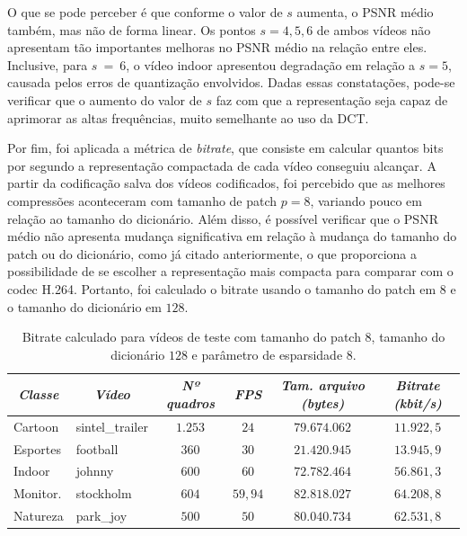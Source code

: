 \documentclass[cic,tc]{iiufrgs}
\begin{document}
O que se pode perceber é que conforme o valor de $s$ aumenta, o PSNR médio também, 
mas não de forma linear.
Os pontos $s=4,5,6$ de ambos vídeos não apresentam tão importantes melhoras no 
PSNR médio na relação entre eles. 
Inclusive, para $s~=~6$, o vídeo indoor apresentou degradação em relação a $s=5$, 
causada pelos erros de quantização envolvidos.
Dadas essas constatações, pode-se verificar que o aumento do valor de $s$ faz com 
que a representação seja capaz de aprimorar as altas frequências, muito semelhante 
ao uso da DCT.

Por fim, foi aplicada a métrica de \emph{bitrate},
que consiste em calcular quantos bits por segundo a representação compactada 
de cada vídeo conseguiu alcançar.
A partir da codificação salva dos vídeos codificados,
foi percebido que as melhores compressões aconteceram com tamanho de patch $p=8$, 
variando pouco em relação ao tamanho do dicionário.
Além disso, é possível verificar que o PSNR médio não apresenta mudança significativa em relação 
à mudança do tamanho do patch ou do dicionário, como já citado anteriormente,
o que proporciona a possibilidade de se escolher a representação mais compacta para 
comparar com o codec H.264.
Portanto, foi calculado o bitrate usando o tamanho do patch em $8$ e o tamanho do dicionário
em $128$.

\begin{table}[h]
    \caption{Bitrate calculado para vídeos de teste com tamanho do patch $8$, tamanho do 
    dicionário $128$ e parâmetro de esparsidade $8$.}
    \centering
        \begin{tabular}{|l|l|c|c|c|c|}
          \hline
          \multicolumn{1}{|c}{\textit{Classe}} & 
          \multicolumn{1}{|c}{\textit{Vídeo}} & 
          \multicolumn{1}{|c}{\textit{Nº quadros}} & 
          \multicolumn{1}{|c}{\textit{FPS}} & 
          \multicolumn{1}{|c}{\textit{Tam. arquivo (bytes)}} & 
          \multicolumn{1}{|c|}{\textit{Bitrate (kbit/s)}} \\
          \hline
          \hline
          Cartoon & sintel\_trailer & $1.253$ & $24$ & $79.674.062$ & $11.922,5$ \\
          Esportes & football &  $360$ & $30$ & $21.420.945$ & $13.945,9$ \\
          Indoor & johnny  &   $600$ & $60$ & $72.782.464$ & $56.861,3$ \\
          Monitor. & stockholm & $604$ & $59,94$ & $82.818.027$ & $64.208,8$ \\
          Natureza & park\_joy & $500$ & $50$ & $80.040.734$ & $62.531,8$ \\
          \hline
        \end{tabular}
    \label{tbl:bitrate}
\end{table}
\end{document}
